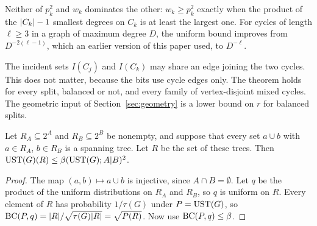 Neither of $p_k^2$ and $w_k$ dominates the other: $w_k\ge p_k^2$ exactly when the product of the $\lvert C_k\rvert-1$ smallest degrees on $C_k$ is at least the largest one. For cycles of length $\ell\ge3$ in a graph of maximum degree $D$, the uniform bound improves from $D^{-2(\ell-1)}$, which an earlier version of this paper used, to $D^{-\ell}$.

The incident sets $I(C_j)$ and $I(C_k)$ may share an edge joining the two cycles. This does not matter, because the bits use cycle edges only. The theorem holds for every split, balanced or not, and every family of vertex-disjoint mixed cycles. The geometric input of Section~\ref{sec:geometry} is a lower bound on $r$ for balanced splits.

\begin{corollary}\label{cor:rectangle}
Let $R_A\subseteq2^A$ and $R_B\subseteq2^B$ be nonempty, and suppose that every set $a\cup b$ with $a\in R_A$, $b\in R_B$ is a spanning tree. Let $R$ be the set of these trees. Then $\mathrm{UST}(G)(R)\le\beta(\mathrm{UST}(G);A|B)^2$.
\end{corollary}

\begin{proof}
The map $(a,b)\mapsto a\cup b$ is injective, since $A\cap B=\emptyset$. Let $q$ be the product of the uniform distributions on $R_A$ and $R_B$, so $q$ is uniform on $R$. Every element of $R$ has probability $1/\tau(G)$ under $P=\mathrm{UST}(G)$, so $\mathrm{BC}(P,q)=\lvert R\rvert/\sqrt{\tau(G)\lvert R\rvert}=\sqrt{P(R)}$. Now use $\mathrm{BC}(P,q)\le\beta$.
\end{proof}
